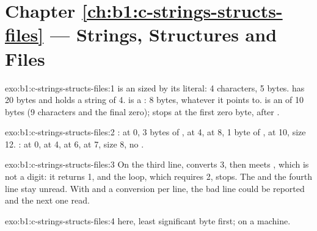 \section*{Chapter \ref{ch:b1:c-strings-structs-files} --- Strings, Structures and Files}

\begin{solution}{exo:b1:c-strings-structs-files:1}
 is an  sized by its literal: 4 characters, 5 bytes.  has 20 bytes and holds a string of 4.
 is a : 8 bytes, whatever it points to.  is an  of 10 bytes (9 characters and the final
zero);  stops at the first zero byte, after .
\end{solution}

\begin{solution}{exo:b1:c-strings-structs-files:2}
:  at 0, 3 bytes of ,  at 4,  at 8, 1 byte of ,  at 10,
size 12. :  at 0,  at 4,  at 6,  at 7, size 8, no .
\end{solution}

\begin{solution}{exo:b1:c-strings-structs-files:3}
On the third line,  converts 3, then meets , which is not a digit: it returns 1, and the loop,
which requires 2, stops. The  and the fourth line stay unread. With  and a conversion per line,
the bad line could be reported and the next one read.
\end{solution}

\begin{solution}{exo:b1:c-strings-structs-files:4}
 here, least significant byte first;  on a  machine.
\end{solution}

